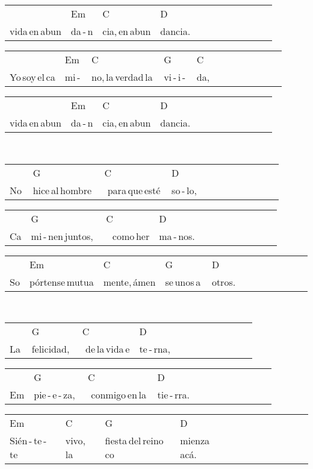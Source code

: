 \begin{multicols}{2}
\begin{minipage}{\columnwidth}
\noindent
\begin{tabular}{llllllllllll}
&Em&C&D\\
vida\,en\,abun&da\,-\,n&cia,\,en\,abun&dancia.
\end{tabular}

\noindent
\begin{tabular}{llllllllllll}
&Em&C&G&C\\
Yo\,soy\,el\,ca&mi\,-\,&no,\,la\,verdad\,la\,&vi\,-\,i\,-\,&da,
\end{tabular}

\noindent
\begin{tabular}{llllllllllll}
&Em&C&D\\
vida\,en\,abun&da\,-\,n&cia,\,en\,abun&dancia.
\end{tabular}
\end{minipage}\\

\noindent
\begin{minipage}{\columnwidth}
\noindent
\noindent
\begin{tabular}{llllllllllll}
&G&C&D\\
No\,&hice\,al\,hombre\,\,&\,\,para\,que\,esté\,&so\,-\,lo,
\end{tabular}

\noindent
\begin{tabular}{llllllllllll}
&G&C&D\\
Ca&mi\,-\,nen\,juntos,\,\,&\,\,\,\,como\,her&ma\,-\,nos.
\end{tabular}

\noindent
\begin{tabular}{llllllllllll}
&Em&C&G&D\\
So&pórtense\,mutua&mente,\,ámen&se\,unos\,a\,&otros.
\end{tabular}
\end{minipage}\\

\noindent
\begin{minipage}{\columnwidth}
\noindent
\noindent
\begin{tabular}{llllllllllll}
&G&C&D\\
La\,&felicidad,\,\,&\,\,de\,la\,vida\,e&te\,-\,rna,
\end{tabular}

\noindent
\begin{tabular}{llllllllllll}
&G&C&D\\
Em&pie\,-\,e\,-\,za,\,\,&\,\,conmigo\,en\,la\,&tie\,-\,rra.
\end{tabular}

\noindent
\begin{tabular}{llllllllllll}
Em&C&G&D\\
Sién\,-\,te\,-\,te\,&vivo,\,la\,&fiesta\,del\,reino\,co&mienza\,acá.
\end{tabular}
\end{minipage}\\


\chorus{}

\end{multicols}